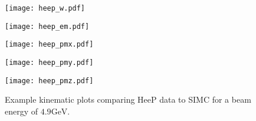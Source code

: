 \begin{figure}
  \centering
  \begin{minipage}[b]{0.48\linewidth}
    \texttt{[image: heep\_w.pdf]}
  \end{minipage}
  \hfill
  \begin{minipage}[b]{0.48\linewidth}
    \texttt{[image: heep\_em.pdf]}
  \end{minipage}
  
  \vspace{0.5cm}
  
  \begin{minipage}[b]{0.48\linewidth}
    \texttt{[image: heep\_pmx.pdf]}
  \end{minipage}
  \hfill
  \begin{minipage}[b]{0.48\linewidth}
    \texttt{[image: heep\_pmy.pdf]}
  \end{minipage}
  \hfill
  \begin{minipage}[b]{0.48\linewidth}
    \texttt{[image: heep\_pmz.pdf]}
  \end{minipage}  
  
  \caption{Example kinematic plots comparing HeeP data to SIMC for a beam energy of $4.9 \mathrm{GeV}$.}
  \label{fig:3-4_heep}
\end{figure}

